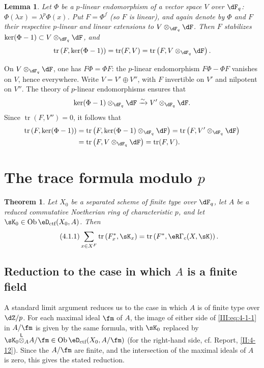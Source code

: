 \documentclass[12pt,oneside,english]{smfbook}
\DeclareMathOperator{\ob}{Ob}
\DeclareMathOperator{\tr}{tr}
\newcounter{char}
\newcommand{\iso}{\xrightarrow\sim}
\newcommand{\lotimes}{{\overset{\mathsf{L}}{\otimes}}}
\newtheorem{lemma_}[subsection]{Lemma}
\newtheorem{theorem_}[subsection]{Theorem}
\begin{document}
\begin{lemma_}\label{III:3-8}
Let $\Phi$ be a $p$-linear endomorphism of a vector space $V$ over $\dF_q$: $\Phi(\lambda x)=\lambda^p\Phi(x)$. Put $F=\Phi^f$ (so $F$ is linear), and again denote by $\Phi$ and $F$ their respective $p$-linear and linear extensions to $V\otimes_{\dF_q}\dF$. Then $F$ stabilizes $\ker(\Phi-1)\subset V\otimes_{\dF_q}\dF$, and
\[
  \tr\left(F,\ker(\Phi-1)\right) = \tr(F,V) = \tr\left(F,V\otimes_{\dF_q}\dF\right) \text{.}
\]
\end{lemma_}

On $V\otimes_{\dF_q}\dF$, one has $F\Phi=\Phi F$: the $p$-linear endomorphism $F\Phi-\Phi F$ vanishes on $V$, hence everywhere. Write $V=V'\oplus V''$, with $F$ invertible on $V'$ and nilpotent on $V''$. The theory of $p$-linear endomorphisms ensures that
\[
  \ker(\Phi-1)\otimes_{\dF_q}\dF \iso V'\otimes_{\dF_q}\dF \text{.}
\]
Since $\tr(F,V'')=0$, it follows that
\begin{align*}
  \tr\left(F,\ker(\Phi-1)\right)
    &= \tr\left(F,\ker(\Phi-1)\otimes_{\dF_q}\dF\right) = \tr\left(F,V'\otimes_{\dF_q}\dF\right) \\
    &= \tr\left(F,V\otimes_{\dF_q}\dF\right) = \tr(F,V) \text{.}
\end{align*}

\section{The trace formula modulo \texorpdfstring{$p$}{p}}\label{III:4}

\begin{theorem_}\label{III:4-1}
Let $X_0$ be a separated scheme of finite type over $\dF_q$, let $A$ be a reduced commutative Noetherian ring of characteristic $p$, and let $\sK_0\in\ob\eD_\textnormal{ctf}(X_0,A)$. Then
\begin{equation*}\tag{4.1.1}\label{III:eq:4-1-1}
  \sum_{x\in X^F} \tr\left(F_x^*,\sK_x\right) = \tr\left(F^*,\eR\Gamma_c(X,\sK)\right) \text{.}
\end{equation*}
\end{theorem_}

\subsection{Reduction to the case in which \texorpdfstring{$A$}{A} is a finite field}\label{III:4-2}

A standard limit argument reduces us to the case in which $A$ is of finite type over $\dZ/p$. For each maximal ideal $\fm$ of $A$, the image of either side of \eqref{III:eq:4-1-1} in $A/\fm$ is given by the same formula, with $\sK_0$ replaced by $\sK_0\lotimes_A A/\fm\in\ob\eD_\text{ctf}(X_0,A/\fm)$ (for the right-hand side, cf. Report, \ref{II:4-12}). Since the $A/\fm$ are finite, and the intersection of the maximal ideals of $A$ is zero, this gives the stated reduction.
\end{document}
